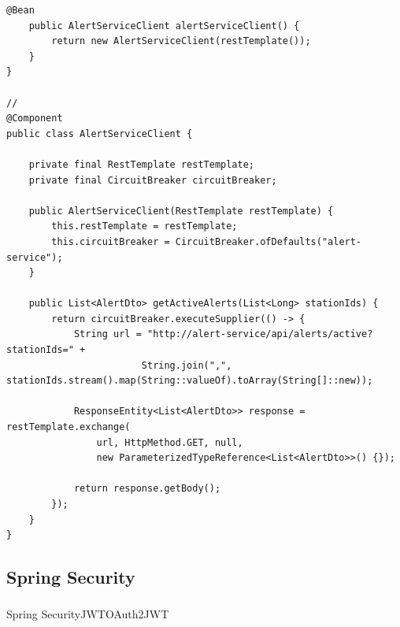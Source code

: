 \begin{lstlisting}[style=java]
    @Bean
    public AlertServiceClient alertServiceClient() {
        return new AlertServiceClient(restTemplate());
    }
}

// 
@Component
public class AlertServiceClient {
    
    private final RestTemplate restTemplate;
    private final CircuitBreaker circuitBreaker;
    
    public AlertServiceClient(RestTemplate restTemplate) {
        this.restTemplate = restTemplate;
        this.circuitBreaker = CircuitBreaker.ofDefaults("alert-service");
    }
    
    public List<AlertDto> getActiveAlerts(List<Long> stationIds) {
        return circuitBreaker.executeSupplier(() -> {
            String url = "http://alert-service/api/alerts/active?stationIds=" + 
                        String.join(",", stationIds.stream().map(String::valueOf).toArray(String[]::new));
                        
            ResponseEntity<List<AlertDto>> response = restTemplate.exchange(
                url, HttpMethod.GET, null, 
                new ParameterizedTypeReference<List<AlertDto>>() {});
                
            return response.getBody();
        });
    }
}
\end{lstlisting}

\hypertarget{spring-security}{%
\subsection{Spring Security}\label{spring-security}}

\hypertarget{section-77}{%
\subsubsection{}\label{section-77}}

Spring SecurityJWTOAuth2JWT

